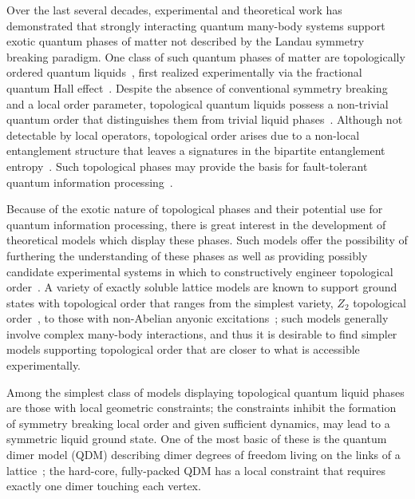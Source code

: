 \documentclass[twocolumn,prb,aps,floatfix,superscriptaddress]{revtex4-1}
\begin{document}
Over the last several decades, experimental and theoretical work has demonstrated that strongly interacting quantum many-body systems support exotic quantum phases of matter not described by the Landau symmetry breaking paradigm. One class of such quantum phases of matter are topologically ordered quantum liquids~\cite{Wen1990}, first realized experimentally via the fractional quantum Hall effect~\cite{FQHE????}. Despite the absence of conventional symmetry breaking and a local order parameter, topological quantum liquids possess a non-trivial quantum order that distinguishes them from trivial liquid phases~\cite{Nayak2008}. Although not detectable by local operators, topological order arises due to a non-local entanglement structure that leaves a signatures in the bipartite entanglement entropy~\cite{Levin2006a,Kitaev2006b}. Such topological phases may provide the basis for fault-tolerant quantum information processing~\cite{Freedman2001,Kitaev2003}.

Because of the exotic nature of topological phases and their potential use for quantum information processing, there is great interest in the development of theoretical models which display these phases. Such models offer the possibility of furthering the understanding of these phases as well as providing possibly candidate experimental systems in which to constructively engineer topological order~\cite{Duan2003,Jaksch2005,Lewenstein2007,Jiang2008d,Weimer2010a,Herdman2010c,Martinis2015}. A variety of exactly soluble lattice models are known to support ground states with topological order that ranges from the simplest variety, $Z_2$ topological order~\cite{Kitaev2003,Wen2003}, to those with non-Abelian anyonic excitations~\cite{Levin2005a,Kitaev2006a}; such models generally involve complex many-body interactions, and thus it is desirable to find simpler models supporting topological order that are closer to what is accessible experimentally.

Among the simplest class of models displaying topological quantum liquid phases are those with local geometric constraints; the constraints inhibit the formation of symmetry breaking local order and given sufficient dynamics, may lead to a symmetric liquid ground state. One of the most basic of these is the quantum dimer model (QDM) describing dimer degrees of freedom living on the links of a lattice~\cite{Rokhsar1988,Moessner2008}; the hard-core, fully-packed QDM has a local constraint that requires exactly one dimer touching each vertex.
\end{document}
